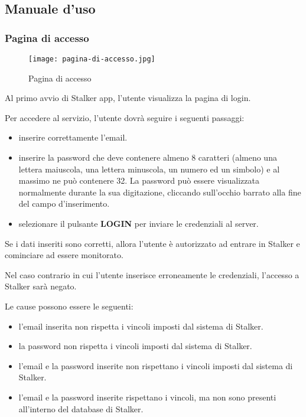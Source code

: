 \documentclass[../manuale-utente.tex]{subfiles}
\begin{document}
\subsection{Manuale d'uso}%
\label{sub:manuale_uso_mobile}

\subsubsection{Pagina di accesso}%
\label{sub:pagina_di_accesso}

\begin{figure}[H]
    \centering
    \texttt{[image: pagina-di-accesso.jpg]}
    \caption{Pagina di accesso}%
    \label{fig:mobile_app_pagina_di_accesso}
\end{figure}

Al primo avvio di Stalker app, l'utente visualizza la pagina di login.

Per accedere al servizio, l'utente dovrà seguire i seguenti passaggi:
\begin{itemize}
    \item inserire correttamente l'email.
    \item inserire la password che deve contenere almeno 8 caratteri (almeno una lettera maiuscola, una lettera minuscola, un numero ed un simbolo) e al massimo ne può contenere 32. La password può essere visualizzata normalmente durante la sua digitazione, cliccando sull'occhio barrato alla fine del campo d'inserimento.
    \item selezionare il pulsante \textbf{LOGIN} per inviare le credenziali al server.
\end{itemize}

Se i dati inseriti sono corretti, allora l'utente è autorizzato ad entrare in Stalker e cominciare ad essere monitorato.

Nel caso contrario in cui l'utente inserisce erroneamente le credenziali, l'accesso a Stalker sarà negato.

Le cause possono essere le seguenti:
\begin{itemize}
    \item l'email inserita non rispetta i vincoli imposti dal sistema di Stalker.
    \item la password non rispetta i vincoli imposti dal sistema di Stalker.
    \item l'email e la password inserite non rispettano i vincoli imposti dal sistema di Stalker.
    \item l'email e la password inserite rispettano i vincoli, ma non sono presenti all'interno del database di Stalker.
\end{itemize}
\end{document}

